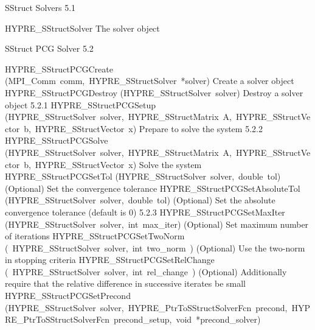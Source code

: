 \documentclass{article}
\begin{document}
\begin{cxxentry}
\begin{cxxdoc}
\end{cxxdoc}
\begin{cxxentry}
{}
        {SStruct Solvers}
        {}
        {
}
        {5.1}
\begin{cxxnames}
        {HYPRE\_SStructSolver}
        {}
        {
The solver object}
        {}
\label{cxx.5.1.1}
\end{cxxnames}
\end{cxxentry}
\begin{cxxentry}
{}
        {SStruct PCG Solver}
        {}
        {
}
        {5.2}
\begin{cxxnames}
        {HYPRE\_SStructPCGCreate}
        {(MPI\_Comm\ comm,\ HYPRE\_SStructSolver\ *solver)}
        {
Create a solver object}
        {}
\label{cxx.5.2.4}
        {HYPRE\_SStructPCGDestroy}
        {(HYPRE\_SStructSolver\ solver)}
        {
Destroy a solver object}
        {5.2.1}
        {HYPRE\_SStructPCGSetup}
        {(HYPRE\_SStructSolver\ solver,\ HYPRE\_SStructMatrix\ A,\ HYPRE\_SStructVector\ b,\ HYPRE\_SStructVector\ x)}
        {
Prepare to solve the system}
        {5.2.2}
        {HYPRE\_SStructPCGSolve}
        {(HYPRE\_SStructSolver\ solver,\ HYPRE\_SStructMatrix\ A,\ HYPRE\_SStructVector\ b,\ HYPRE\_SStructVector\ x)}
        {
Solve the system}
        {}
\label{cxx.5.2.5}
        {HYPRE\_SStructPCGSetTol}
        {(HYPRE\_SStructSolver\ solver,\ double\ tol)}
        {
(Optional) Set the convergence tolerance}
        {}
\label{cxx.5.2.6}
        {HYPRE\_SStructPCGSetAbsoluteTol}
        {(HYPRE\_SStructSolver\ solver,\ double\ tol)}
        {
(Optional) Set the absolute convergence tolerance (default is
0)}
        {5.2.3}
        {HYPRE\_SStructPCGSetMaxIter}
        {(HYPRE\_SStructSolver\ solver,\ int\ max\_iter)}
        {
(Optional) Set maximum number of iterations}
        {}
\label{cxx.5.2.7}
        {HYPRE\_SStructPCGSetTwoNorm}
        {(\ HYPRE\_SStructSolver\ solver,\ int\ two\_norm\ )}
        {
(Optional) Use the two-norm in stopping criteria}
        {}
\label{cxx.5.2.8}
        {HYPRE\_SStructPCGSetRelChange}
        {(\ HYPRE\_SStructSolver\ solver,\ int\ rel\_change\ )}
        {
(Optional) Additionally require that the relative difference in
successive iterates be small}
        {}
\label{cxx.5.2.9}
        {HYPRE\_SStructPCGSetPrecond}
        {(HYPRE\_SStructSolver\ solver,\ HYPRE\_PtrToSStructSolverFcn\ precond,\ HYPRE\_PtrToSStructSolverFcn\ precond\_setup,\ void\ *precond\_solver)}

\end{cxxnames}
\end{cxxentry}
\end{cxxentry}
\end{document}
